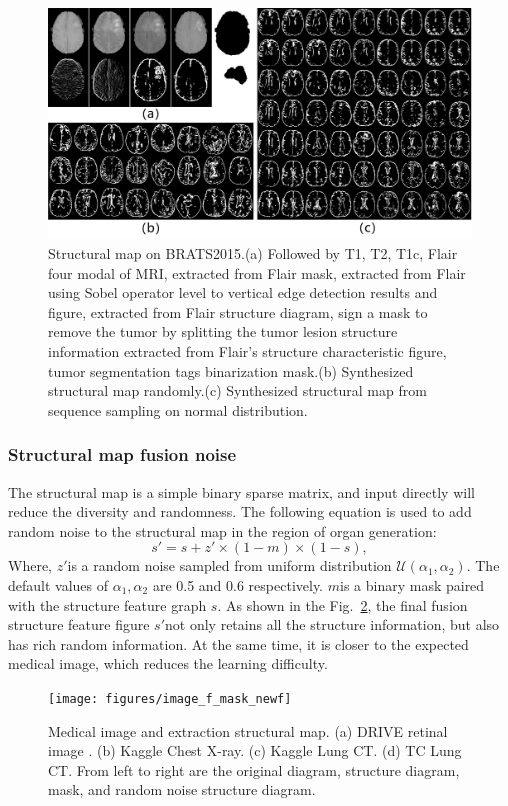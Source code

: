 \documentclass[runningheads]{llncs}
\begin{document}
	\begin{figure}[thbp!]
		\centering
		\includegraphics[width=1\linewidth]{figures/brats_f}
		\caption{Structural map on BRATS2015.(a) Followed by T1, T2, T1c, Flair four modal of MRI, extracted from Flair mask, extracted from Flair using Sobel operator level to vertical edge detection results and figure, extracted from Flair structure diagram, sign a mask to remove the tumor by splitting the tumor lesion structure information extracted from Flair's structure characteristic figure, tumor segmentation tags binarization mask.(b) Synthesized structural map randomly.(c) Synthesized structural map from sequence sampling on normal distribution.}
		\label{generated_f}
	\end{figure}
	
	\subsubsection{Structural map fusion noise}
	The structural map is a simple binary sparse matrix, and input directly will reduce the diversity and randomness. The following equation is used to add random noise to the structural map in the region of organ generation:
	\begin{equation}
	s'=s+z'\times(1-m)\times(1-s),
	\end{equation}
	Where, $z'$is a random noise sampled from uniform distribution $\mathcal{U}(\alpha_1,\alpha_2)$. The default values of $\alpha_1,\alpha_2$ are 0.5 and 0.6 respectively. $m$is a binary mask paired with the structure feature graph $s$. As shown in the Fig.~\ref{image_and_f}, the final fusion structure feature figure $s'$not only retains all the structure information, but also has rich random information. At the same time, it is closer to the expected medical image, which reduces the learning difficulty.
	\begin{figure}[thbp!]
		\centering
		\texttt{[image: figures/image\_f\_mask\_newf]}
		\caption{Medical image and extraction structural map. (a) DRIVE retinal image . (b) Kaggle Chest X-ray. (c) Kaggle Lung CT. (d) TC Lung CT. From left to right are the original diagram, structure diagram, mask, and random noise structure diagram.}
		\label{image_and_f}
	\end{figure}
\end{document}
